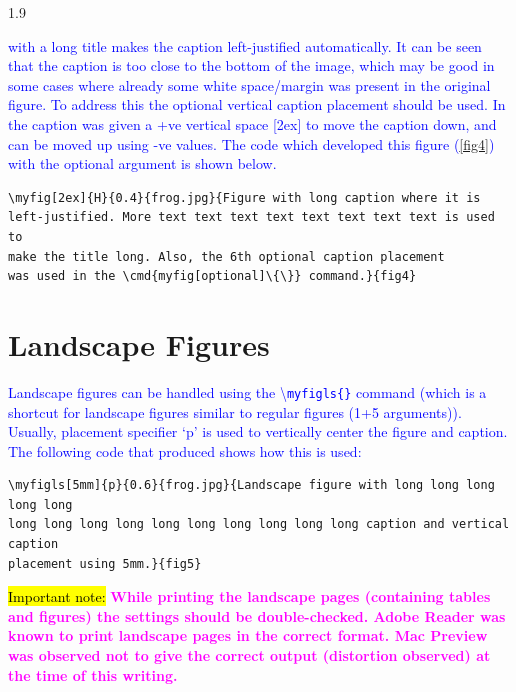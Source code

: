 \documentclass[phd]{ndsu-thesis-2022}
\newcommand\myspacing{1.9} %
\newcommand\italk[1]{\textcolor{blue}{#1}}  %
\newcommand\cmd[1]{\textbackslash\texttt{#1}}  %
\begin{document}
\begin{spacing}{\myspacing}

\italk{ with a long title makes the caption left-justified automatically. It can be seen that the caption is too close to the bottom of the image, which may be good in some cases where already some white space/margin was present in the original figure. To address this the optional vertical caption placement should be used. In \Cref{fig4} the caption was given a +ve vertical space [2ex] to move the caption down, and can be moved up using -ve values. The code which developed this figure (\cref{fig4}) with the optional argument is shown below.
}

{\singlespacing
\begin{verbatim}
\myfig[2ex]{H}{0.4}{frog.jpg}{Figure with long caption where it is 
left-justified. More text text text text text text text text is used to 
make the title long. Also, the 6th optional caption placement 
was used in the \cmd{myfig[optional]\{\}} command.}{fig4}
\end{verbatim}
}


\section{Landscape Figures}

\italk{Landscape figures can be handled using the \cmd{myfigls\{\}} command (which is a shortcut for landscape figures similar to regular figures (1+5 arguments)). Usually, placement specifier `p' is used to vertically center the figure and caption. The following code that produced \Cref{fig5} shows how this is used:}

\vspace{-4ex}
{\singlespace
\begin{verbatim}
\myfigls[5mm]{p}{0.6}{frog.jpg}{Landscape figure with long long long long long
long long long long long long long long long long caption and vertical caption
placement using 5mm.}{fig5}
\end{verbatim}
}

\italk{\hl{Important note:}} \textcolor{magenta}{\bfseries While printing the landscape pages (containing tables and figures) the settings should be double-checked. Adobe Reader was known to print landscape pages in the correct format. Mac Preview was observed not to give the correct output (distortion observed) at the time of this writing.}


\end{spacing}
\end{document}
